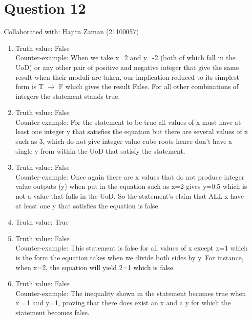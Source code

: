 \documentclass{article}
\begin{document}
\section{Question 12}
Collaborated with: Hajira Zaman (21100057) 
\begin{enumerate}
\item %
Truth value: False \\
Counter-example: When we take x=2 and y=-2 (both of which fall in the UoD) or any other pair of positive and negative integer that give the same result when their moduli are taken, our implication reduced to its simplest form is T $\rightarrow$ F which gives the result False. For all other combinations of integers the statement stands true.
\item %
Truth value: False \\
Counter-example: For the statement to be true all values of x must have at least one integer y that satisfies the equation but there are several values of x such as 3, which do not give integer value cube roots hence don't have a single y from within the UoD that satisfy the statement. 
\item %
Truth value: False \\
Counter-example: Once again there are x values that do not produce integer value outputs (y) when put in the equation such as x=2 gives y=0.5 which is not a value that falls in the UoD. So the statement's claim that ALL x have at least one y that satisfies the equation is false.
\item %
Truth value: True
\item %
Truth value: False \\
Counter-example: This statement is false for all values of x except x=1 which is the form the equation takes when we divide both sides by y. For instance, when x=2, the equation will yield 2=1 which is false.
\item %
Truth value: False \\
Counter-example: The inequality shown in the statement becomes true when x =1 and y=1, proving that there does exist an x and a y for which the statement becomes false.
\end{enumerate}
\end{document}
